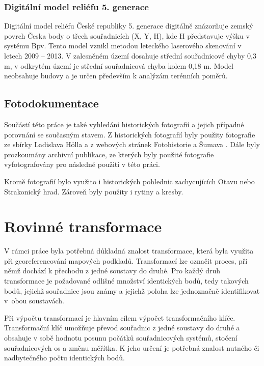 \documentclass[thesis=M,czech]{FITthesis}[2012/06/26]
\begin{document}
\subsection{Digitální model reliéfu 5. generace}
Digitální model reliéfu České republiky 5. generace digitálně znázorňuje zemský povrch Česka body o třech souřadnicích (X, Y, H), kde H představuje výšku v systému Bpv. Tento model vznikl metodou leteckého laserového skenování v letech 2009 – 2013. V zalesněném území dosahuje střední souřadnicové chyby 0,3 m, v odkrytém území je střední souřadnicová chyba kolem 0,18 m. Model neobsahuje budovy a je určen především k analýzám terénních poměrů. \cite{cuzk}



\section{Fotodokumentace}
Součástí této práce je také vyhledání historických fotografií a jejich případné porovnání se současným stavem. Z historických fotografií byly použity fotografie ze sbírky Ladislava Hölla a z webových stránek Fotohistorie \cite{fotohistorie} a Šumava \cite{sumava}. Dále byly prozkoumány archivní publikace, ze kterých byly použité fotografie vyfotografovány pro následné použití v této práci.

Kromě fotografií bylo využito i historických pohlednic zachycujících Otavu nebo Strakonický hrad. Zároveň byly použity i rytiny a kresby.




\chapter{Rovinné transformace}
V rámci práce byla potřebná důkladná znalost transformace, která byla využita při georeferencování mapových podkladů. Transformací lze označit proces, při němž dochází k přechodu z jedné soustavy do druhé. Pro každý druh transformace je požadované odlišné množství identických bodů, tedy takových bodů,  jejichž souřadnice jsou známy a jejichž poloha lze jednoznačně identifikovat v~obou soustavách.

Při výpočtu transformací je hlavním cílem výpočet transformačního klíče. Transformační klíč umožňuje převod souřadnic z jedné soustavy do druhé a obsahuje v sobě hodnotu posunu počátků souřadnicových systémů, stočení souřadnicových os a změnu měřítka. K jeho určení je potřebná znalost nutného či nadbytečného počtu identických bodů. 
\end{document}
